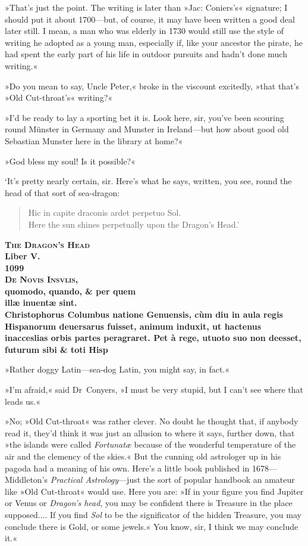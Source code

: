 »That's just the point. The writing is later than »Jac: Coniers's« signature; I should put it about 1700—but, of course, it may have been written a good deal later still. I mean, a man who was elderly in 1730 would still use the style of writing he adopted as a young man, especially if, like your ancestor the pirate, he had spent the early part of his life in outdoor pursuits and hadn't done much writing.«

»Do you mean to say, Uncle Peter,« broke in the viscount excitedly, »that that's »Old Cut-throat's« writing?«

»I'd be ready to lay a sporting bet it is. Look here, sir, you've been scouring round Münster in Germany and Munster in Ireland—but how about good old Sebastian Munster here in the library at home?«

»God bless my soul! Is it possible?«

`It's pretty nearly certain, sir. Here's what he says, written, you see, round the head of that sort of sea-dragon:
\begin{quote}
Hic in capite draconis ardet perpetuo Sol.\\
Here the sun shines perpetually upon the Dragon's Head.'
\end{quote}

\begin{center}\bfseries
\textsc{The Dragon's Head}\\
Liber V\@.\\
1099\\
\textsc{De Novis Insvlis,}\\
quomodo, quando, \& per quem\\
illæ inuentæ sint.\\
Christophorus Columbus natione Genuensis, cùm diu in aula regis Hispanorum deuersarus fuisset, animum induxit, ut hactenus inacceslias orbis partes peragraret. Pet à rege, utuoto suo non deesset, futurum sibi \& toti Hisp
\end{center}

\divider
»Rather doggy Latin—sea-dog Latin, you might say, in fact.«

»I'm afraid,« said Dr~Conyers, »I must be very stupid, but I can't see where that leads us.«

»No; »Old Cut-throat« was rather clever. No doubt he thought that, if anybody read it, they'd think it was just an allusion to where it says, further down, that »the islands were called \textit{Fortunatæ} because of the wonderful temperature of the air and the clemency of the skies.« But the cunning old astrologer up in his pagoda had a meaning of his own. Here's a little book published in 1678—Middleton's \textit{Practical Astrology}—just the sort of popular handbook an amateur like »Old Cut-throat« would use. Here you are: »If in your figure you find Jupiter or Venus or \textit{Dragon's head}, you may be confident there is Treasure in the place supposed.... If you find \textit{Sol} to be the significator of the hidden Treasure, you may conclude there is Gold, or some jewels.« You know, sir, I think we may conclude it.«


